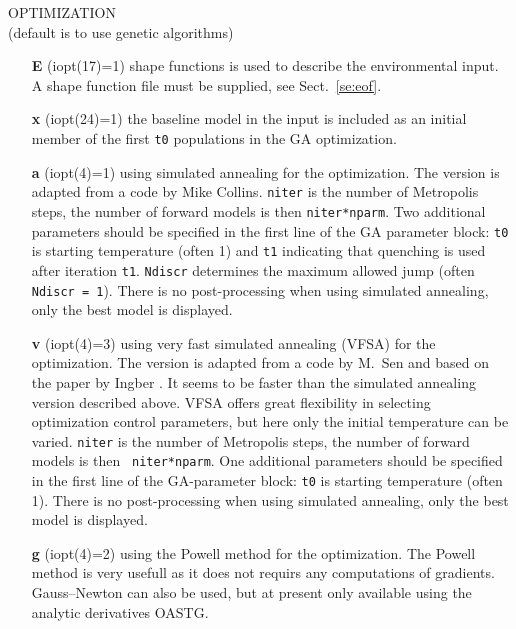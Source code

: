 \documentclass{saclantc}
\begin{document}
\noindent OPTIMIZATION\\
(default is to use genetic algorithms)

\vspace{-0.6cm}
\begin{itemize}
    \item[{\bf E}] (iopt(17)=1) shape functions is used to describe the environmental
input. A shape function file must be supplied, see Sect.\ \ref{se:eof}. 
\vspace{-0.3cm}
    \item[{\bf x}] (iopt(24)=1) the baseline model in the input is included
as an initial member of the first {\tt t0} populations in the GA optimization.  
\vspace{-0.3cm}
    \item[{\bf a}] (iopt(4)=1) using simulated annealing for the optimization.
The version is adapted from a code by Mike Collins. {\tt niter} is the
number of
Metropolis steps, the number of forward models is then {\tt niter*nparm}.
Two additional parameters should be specified in the first line of the
GA parameter block:
{\tt t0}
is starting temperature (often 1) and {\tt t1} indicating that quenching 
is used after iteration
{\tt t1}. {\tt Ndiscr} determines the maximum allowed jump (often 
{\tt Ndiscr = 1}).  
There is no post-processing when using simulated annealing, only the best model
is displayed.
\vspace{-0.3cm}
    \item[{\bf v}] (iopt(4)=3) 
using very fast simulated annealing (VFSA) for the optimization.
The version is adapted from a code by M.~Sen and based on the paper by
Ingber \cite{ingber:93}. It seems to be faster than the simulated annealing version
described above. VFSA offers great flexibility in selecting
optimization control
parameters, but here only the initial temperature can be varied.
 {\tt niter} is the number of
Metropolis steps, the number of forward models is then {\tt
niter*nparm}.
One additional parameters should be specified in the first line of the
GA-parameter block:
{\tt t0}
is starting temperature (often 1). 
There is no post-processing when using simulated annealing, only the best model
is displayed.
\vspace{-0.3cm}
    \item[{\bf g}] (iopt(4)=2)  using the Powell method  for the optimization.
The Powell method is very usefull as it does not requirs any
computations of gradients. {Gauss--Newton
      can also be used, but  at present only available using the analytic derivatives {\sf OASTG}}.

\end{itemize}
\end{document}
